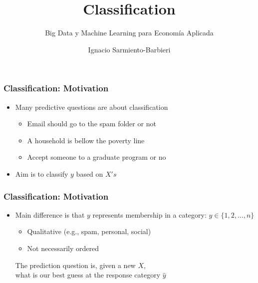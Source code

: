 \documentclass[
  shownotes,
  xcolor={svgnames},
  hyperref={colorlinks,citecolor=DarkBlue,linkcolor=andesred,urlcolor=DarkBlue}
  , aspectratio=169]{beamer}
\begin{document}
\title{Classification}
\subtitle{Big Data y Machine Learning para Economía Aplicada}
\date{}

\author[Sarmiento-Barbieri]{Ignacio Sarmiento-Barbieri}


\begin{frame}[noframenumbering]
\maketitle
\end{frame}


\begin{frame}[fragile]
\frametitle{Classification: Motivation}

\begin{itemize}
  \item Many predictive questions are about classification
  \medskip
  \begin{itemize}
      \item Email should go to the spam folder or not
      \medskip
      \item A household is bellow the poverty line
      \medskip
      \item Accept someone to a graduate program or no
      \medskip
      \end{itemize}
\item Aim is to classify $y$ based on $X's$

\end{itemize}
\end{frame}
\begin{frame}[fragile]
\frametitle{Classification: Motivation}

\begin{itemize}
\item Main difference is that $y$ represents membership in a category: $y\in \{1,2,...,n\}$
\medskip
\begin{itemize}
  \item Qualitative (e.g., spam, personal, social)
  \medskip
  \item Not necessarily ordered
  
\end{itemize}
\bigskip
  \begin{center}
    \begin{it}
    \large
      The prediction question is, given a new $X$, \\
      what is our best guess at the response category $\hat{y}$
    \end{it}
  \end{center}
\end{itemize}


\end{frame}
\end{document}
